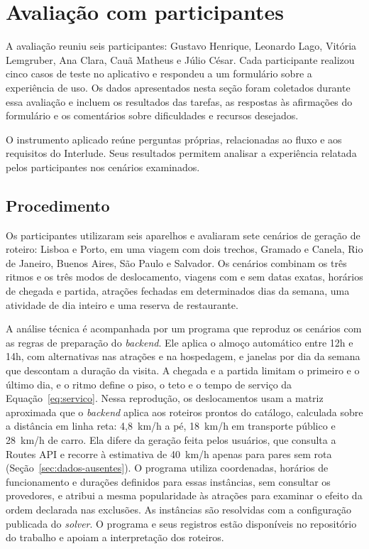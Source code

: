 \section{Avaliação com participantes}
\label{sec:avaliacao-participantes}

A avaliação reuniu seis participantes: Gustavo Henrique, Leonardo Lago, Vitória Lemgruber, Ana Clara, Cauã Matheus e Júlio César. Cada participante realizou cinco casos de teste no aplicativo e respondeu a um formulário sobre a experiência de uso. Os dados apresentados nesta seção foram coletados durante essa avaliação e incluem os resultados das tarefas, as respostas às afirmações do formulário e os comentários sobre dificuldades e recursos desejados.

O instrumento aplicado reúne perguntas próprias, relacionadas ao fluxo e aos requisitos do Interlude. Seus resultados permitem analisar a experiência relatada pelos participantes nos cenários examinados.

\subsection{Procedimento}

Os participantes utilizaram seis aparelhos e avaliaram sete cenários de geração de roteiro: Lisboa e Porto, em uma viagem com dois trechos, Gramado e Canela, Rio de Janeiro, Buenos Aires, São Paulo e Salvador. Os cenários combinam os três ritmos e os três modos de deslocamento, viagens com e sem datas exatas, horários de chegada e partida, atrações fechadas em determinados dias da semana, uma atividade de dia inteiro e uma reserva de restaurante.

A análise técnica é acompanhada por um programa que reproduz os cenários com as regras de preparação do \textit{backend}. Ele aplica o almoço automático entre 12h e 14h, com alternativas nas atrações e na hospedagem, e janelas por dia da semana que descontam a duração da visita. A chegada e a partida limitam o primeiro e o último dia, e o ritmo define o piso, o teto e o tempo de serviço da Equação~\ref{eq:servico}. Nessa reprodução, os deslocamentos usam a matriz aproximada que o \textit{backend} aplica aos roteiros prontos do catálogo, calculada sobre a distância em linha reta: 4,8~km/h a pé, 18~km/h em transporte público e 28~km/h de carro. Ela difere da geração feita pelos usuários, que consulta a Routes API e recorre à estimativa de 40~km/h apenas para pares sem rota (Seção~\ref{sec:dados-ausentes}). O programa utiliza coordenadas, horários de funcionamento e durações definidos para essas instâncias, sem consultar os provedores, e atribui a mesma popularidade às atrações para examinar o efeito da ordem declarada nas exclusões. As instâncias são resolvidas com a configuração publicada do \textit{solver}. O programa e seus registros estão disponíveis no repositório do trabalho \cite{interlude2026repositorio} e apoiam a interpretação dos roteiros.

